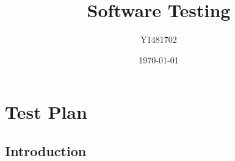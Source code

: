 \documentclass{article}
\title{Software Testing}
\author{Y1481702}
\date{\today}
\begin{document}
\begin{titlepage}
\clearpage\maketitle
\thispagestyle{empty}
\tableofcontents
\end{titlepage}






\section{Test Plan}%
\subsection{Introduction}
\end{document}
